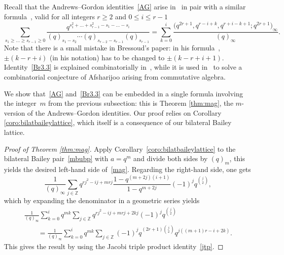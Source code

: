 \documentclass[pdftex]{sigma}
\numberwithin{equation}{section}
\begin{document}
Recall that the Andrews--Gordon identities~\eqref{AG} arise in~\cite{Br80} in pair with a similar formula~\cite[equation~(3.3)]{Br80}, valid for all integers $r \geq 2$ and $0\leq i\leq r-1$
\begin{equation}\label{Br3.3}
\sum_{s_1\geq\dots\geq s_{r-1}\geq0}\frac{q^{s_1^2+\dots+s_{r-1}^2-s_1-\dots-s_i}}{(q)_{s_1-s_2}\cdots(q)_{s_{r-2}-s_{r-1}}(q)_{s_{r-1}}} =\sum_{k=0}^{i}\frac{\bigl(q^{2r+1},q^{r-i+k},q^{r+i-k+1};q^{2r+1}\bigr)_\infty}{(q)_\infty}.
\end{equation}
Note that there is a small mistake in Bressoud's paper: in his formula~\cite[equation~(3.3)]{Br80}, $\pm(k-r+i)$ (in his notation) has to be changed to $\pm(k-r+i+1)$. Identity~\eqref{Br3.3} is explained combinatorially in~\cite{DJK}, while it is used in~\cite{ADJM} to solve a combinatorial conjecture of Afsharijoo arising from commutative algebra.

We show that~\eqref{AG} and~\eqref{Br3.3} can be embedded in a single formula involving the integer~$m$ from the previous subsection: this is Theorem \ref{thm:mag}, the $m$-version of the Andrews--Gordon identities. Our proof relies on Corollary \ref{coro:bilatbaileylattice}, which itself is a consequence of our bilateral Bailey lattice.

\begin{proof}[Proof of Theorem \ref{thm:mag}]
Apply Corollary~\ref{coro:bilatbaileylattice} to the bilateral Bailey pair~\eqref{mbubp} with $a=q^m$ and divide both sides by $(q)_m$, this yields the desired left-hand side of~\eqref{mag}. Regarding the right-hand side, one gets
\begin{equation*}\frac{1}{(q)_\infty}\sum_{j\in\mathbb{Z}}q^{rj^2-ij+mrj}\frac{1-q^{(m+2j)(i+1)}}{1-q^{m+2j}}(-1)^{j}q^{\binom{j}{2}},
\end{equation*}
which by expanding the denominator in a geometric series yields
\begin{gather*}
\frac{1}{(q)_\infty}\sum_{k=0}^iq^{mk}\sum_{j\in\mathbb{Z}}q^{rj^2-ij+mrj+2kj}(-1)^{j}q^{\binom{j}{2}}\\
\qquad=\frac{1}{(q)_\infty}\sum_{k=0}^iq^{mk}\sum_{j\in\mathbb{Z}}(-1)^{j}q^{(2r+1)\binom{j}{2}}q^{j((m+1)r-i+2k)}.
\end{gather*}
This gives the result by using the Jacobi triple product identity~\eqref{jtp}.
\end{proof}
\end{document}
